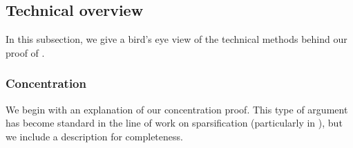 \documentclass[11pt]{article}
\numberwithin{equation}{section}
\begin{document}
\subsection{Technical overview}
\label{sec:overview}

In this subsection, we give a bird's eye view of the technical methods behind our proof of .

\subsubsection{Concentration}
\label{sec:overview_concentration}

We begin with an explanation of our concentration proof. This type of argument has become standard in the line of work on sparsification (particularly in \cite{lee22,jlls23}), but we include a description for completeness.



\end{document}
